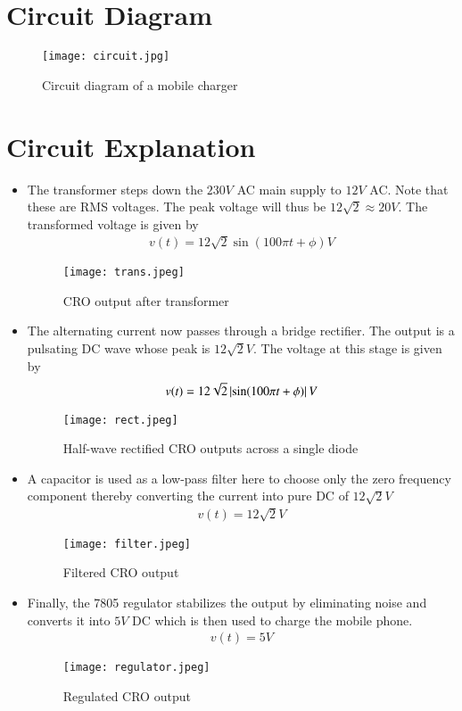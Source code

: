 \documentclass[journal,12pt,twocolumn]{IEEEtran}
\begin{document}
	\section{Circuit Diagram}
	\begin{figure}[!ht]
		\centering
		\texttt{[image: circuit.jpg]}
		\caption{Circuit diagram of a mobile charger}
		\label{fig-ckt}	
	\end{figure}
	
	\section{Circuit Explanation}
	\begin{itemize}
	\item The transformer steps down the $230 V$ AC main supply to $12 V$ AC. Note that these are RMS voltages. The peak voltage will thus be $12\sqrt{2} \approx 20V$. The transformed voltage is given by
	\begin{align}
		v(t) = 12\sqrt{2}\sin(100\pi t + \phi) V
	\end{align}
	\begin{figure}[!ht]
		\centering
		\texttt{[image: trans.jpeg]}
		\caption{CRO output after transformer}
		\label{fig-transformer}	
	\end{figure}
	
	\item The alternating current now passes through a bridge rectifier. The output is a pulsating DC wave whose peak is $12\sqrt{2}V$. The voltage at this stage is given by
	\begin{align}
		v(t) = 12\sqrt{2}\left\vert\sin(100\pi t + \phi)\right\vert V
	\end{align}
	\begin{figure}[!ht]
		\centering
		\texttt{[image: rect.jpeg]}
		\caption{Half-wave rectified CRO outputs across a single diode}
		\label{fig-rectifier-2}	
	\end{figure}
	
	\item A capacitor is used as a low-pass filter here to choose only the zero frequency component thereby converting the current into pure DC of $12\sqrt{2}V$
	\begin{align}
		v(t) = 12\sqrt{2}V
	\end{align}
	\begin{figure}[!ht]
		\centering
		\texttt{[image: filter.jpeg]}
		\caption{Filtered CRO output}
		\label{fig-filter}	
	\end{figure}
	
	\item Finally, the 7805 regulator stabilizes the output by eliminating noise and converts it into $5 V$ DC which is then used to charge the mobile phone.
	\begin{align}
		v(t) = 5 V 
	\end{align}
	\begin{figure}[!ht]
		\centering
		\texttt{[image: regulator.jpeg]}
		\caption{Regulated CRO output}
		\label{fig-regulator}	
	\end{figure}
	\end{itemize}
	
\end{document}
